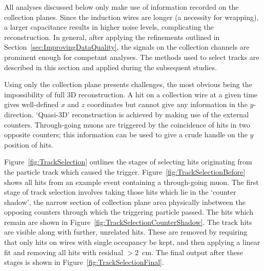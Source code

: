 All analyses discussed below only make use of information recorded on the collection planes.  Since the induction wires are longer (a necessity for wrapping), a larger capacitance results in higher noise levels, complicating the reconstruction.  In general, after applying the refinements outlined in Section~\ref{sec:ImprovingDataQuality}, the signals on the collection channels are prominent enough for competant analyses.  The methods used to select tracks are described in this section and applied during the subsequent studies.

Using only the collection plane presents challenges, the most obvious being the impossibility of full 3D reconstruction.  A hit on a collection wire at a given time gives well-defined $x$ and $z$ coordinates but cannot give any information in the $y$-direction.  `Quasi-3D' reconstruction is achieved by making use of the external counters.  Through-going muons are triggered by the coincidence of hits in two opposite counters; this information can be used to give a crude handle on the $y$ position of hits.

Figure~\ref{fig:TrackSelection} outlines the stages of selecting hits originating from the particle track which caused the trigger.  Figure~\ref{fig:TrackSelectionBefore} shows all hits from an example event containing a through-going muon.  The first stage of track selection involves taking those hits which lie in the `counter shadow', the narrow section of collection plane area physically inbetween the opposing counters through which the triggering particle passed.  The hits which remain are shown in Figure~\ref{fig:TrackSelectionCounterShadow}.  The track hits are visible along with further, unrelated hits.  These are removed by requiring that only hits on wires with single occupancy be kept, and then applying a linear fit and removing all hits with residual $>2$~cm.  The final output after these stages is shown in Figure~\ref{fig:TrackSelectionFinal}.


